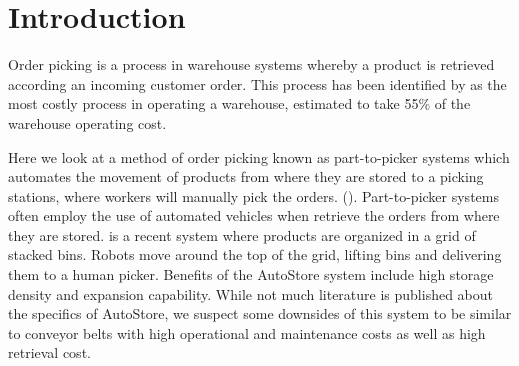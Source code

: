 \documentclass[a4paper,11pt]{article}
\begin{document}
	\begin{abstract} %
	\noindent \textbf The order picking process is the number one expense in warehouse systems. Here we look at part-to-picker a type of order picking where the products are autonomously retrieved and given to the pickers. Previous research have focused on improvements in the multi-agent path finding but they often overlook simple adjustments or additions which may help improve the overall complexity of the problem. This project will test the effect that these [\textbf{LIST THINGS}] have on improving order-picking. We will create a simulation and focus on the warehouse layout first. The results of this project will help identify how small adjustments may affect the efficiency of the order picking process.
	
\end{abstract}
\section{Introduction}
Order picking is a process in warehouse systems whereby a product is retrieved according an incoming customer order. This process has been identified by \cite{de2007design} as the most costly process in operating a warehouse, estimated to take 55\% of the warehouse operating cost.


Here we look at a method of order picking known as part-to-picker systems which automates the movement of products from where they are stored to a picking stations, where workers will manually pick the orders. (\cite{wurman2008coordinating}). Part-to-picker systems often employ the use of automated vehicles when retrieve the orders from where they are stored. \cite{introduction2015autostore} is a recent system where products are organized in a grid of stacked bins. Robots move around the top of the grid, lifting bins and delivering them to a human picker. Benefits of the AutoStore system include high storage density and expansion capability. While not much literature is published about the specifics of AutoStore, we suspect some downsides of this system to be similar to conveyor belts with high operational and maintenance costs as well as high retrieval cost.
\end{document}
